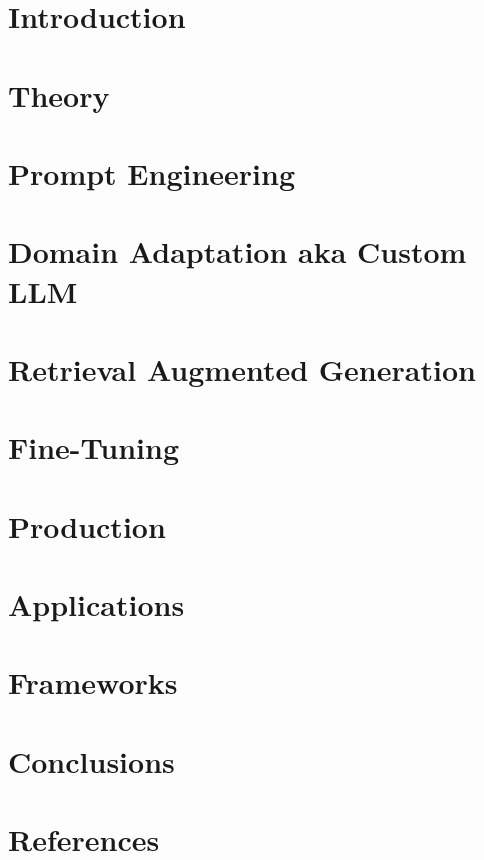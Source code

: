 \section[Intro]{Introduction}


\section[Theory]{Theory}






\section[Prompts]{Prompt Engineering}




\section[DA]{Domain Adaptation aka Custom LLM}



\section[RAG]{Retrieval Augmented Generation}





\section[FT]{Fine-Tuning}


\section[Prod]{Production}





\section[Apps]{Applications}



\section[Frameworks]{Frameworks}








\section[Concl]{Conclusions}


\section[Refs]{References}


